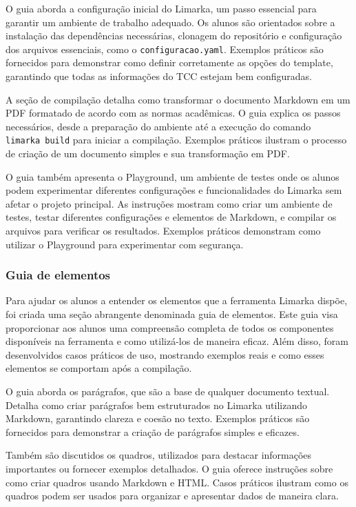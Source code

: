 \documentclass[
	12pt,				%
	oneside,			%
	a4paper,			%
	english,			%
	french,				%
	spanish,			%
	brazil				%
	]{abntex2}
\begin{document}
O guia aborda a configuração inicial do Limarka, um passo essencial para
garantir um ambiente de trabalho adequado. Os alunos são orientados
sobre a instalação das dependências necessárias, clonagem do repositório
e configuração dos arquivos essenciais, como o
\texttt{configuracao.yaml}. Exemplos práticos são fornecidos para
demonstrar como definir corretamente as opções do template, garantindo
que todas as informações do TCC estejam bem configuradas.

A seção de compilação detalha como transformar o documento Markdown em
um PDF formatado de acordo com as normas acadêmicas. O guia explica os
passos necessários, desde a preparação do ambiente até a execução do
comando \texttt{limarka\ build} para iniciar a compilação. Exemplos
práticos ilustram o processo de criação de um documento simples e sua
transformação em PDF.

O guia também apresenta o Playground, um ambiente de testes onde os
alunos podem experimentar diferentes configurações e funcionalidades do
Limarka sem afetar o projeto principal. As instruções mostram como criar
um ambiente de testes, testar diferentes configurações e elementos de
Markdown, e compilar os arquivos para verificar os resultados. Exemplos
práticos demonstram como utilizar o Playground para experimentar com
segurança.

\hypertarget{guia-de-elementos}{%
\subsubsection{Guia de elementos}\label{guia-de-elementos}}

Para ajudar os alunos a entender os elementos que a ferramenta Limarka
dispõe, foi criada uma seção abrangente denominada guia de elementos.
Este guia visa proporcionar aos alunos uma compreensão completa de todos
os componentes disponíveis na ferramenta e como utilizá-los de maneira
eficaz. Além disso, foram desenvolvidos casos práticos de uso, mostrando
exemplos reais e como esses elementos se comportam após a compilação.

O guia aborda os parágrafos, que são a base de qualquer documento
textual. Detalha como criar parágrafos bem estruturados no Limarka
utilizando Markdown, garantindo clareza e coesão no texto. Exemplos
práticos são fornecidos para demonstrar a criação de parágrafos simples
e eficazes.

Também são discutidos os quadros, utilizados para destacar informações
importantes ou fornecer exemplos detalhados. O guia oferece instruções
sobre como criar quadros usando Markdown e HTML. Casos práticos ilustram
como os quadros podem ser usados para organizar e apresentar dados de
maneira clara.
\end{document}
